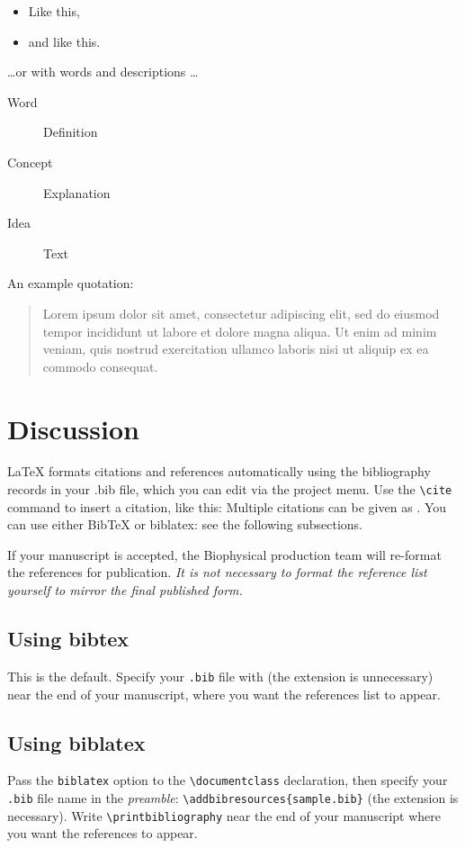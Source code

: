 \documentclass{biophys-new}
\begin{document}
\begin{itemize} 
\item Like this,
\item and like this.
\end{itemize}

\dots or with words and descriptions \dots

\begin{description}
\item[Word] Definition
\item[Concept] Explanation
\item[Idea] Text
\end{description}

An example quotation:

\begin{quote}
Lorem ipsum dolor sit amet, consectetur adipiscing elit, sed do eiusmod tempor incididunt ut labore et dolore magna aliqua. Ut enim ad minim veniam, quis nostrud exercitation ullamco laboris nisi ut aliquip ex ea commodo consequat.
\end{quote}


\section*{Discussion}

\LaTeX{} formats citations and references automatically using the bibliography records in your .bib file, which you can edit via the project menu. Use the \verb|\cite| command to insert a citation, like this: \cite{Chen_Nicholson00} Multiple citations can be given as \cite{Stiles_Bartol01,el-Kareh_etal93,Callaghan91}. You can use either BibTeX or biblatex: see the following subsections.

If your manuscript is accepted, the Biophysical production team will re-format the references for publication. \emph{It is not necessary to format the reference list yourself to mirror the final published form.}

\subsection*{Using bibtex} 
This is the default. Specify your \texttt{.bib} file with \verb|| (the extension is unnecessary) near the end of your manuscript, where you want the references list to appear.

\subsection*{Using biblatex} 
Pass the \texttt{biblatex} option to the \verb|\documentclass| declaration, then specify your \texttt{.bib} file name in the \emph{preamble}: \verb|\addbibresources{sample.bib}| (the extension is necessary). Write \verb|\printbibliography| near the end of your manuscript where you want the references to appear.
\end{document}

